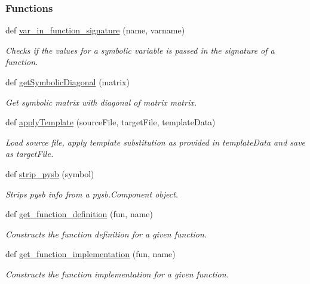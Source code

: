 \subsubsection*{Functions}
\begin{DoxyCompactItemize}
\item 
def \mbox{\hyperlink{namespaceamici_1_1ode__export_a365aaf8b78bb2db9c94b1a8087d60a16}{var\+\_\+in\+\_\+function\+\_\+signature}} (name, varname)
\begin{DoxyCompactList}\small\item\em Checks if the values for a symbolic variable is passed in the signature of a function. \end{DoxyCompactList}\item 
def \mbox{\hyperlink{namespaceamici_1_1ode__export_aed240175cce2aa528fe24d1486c52559}{get\+Symbolic\+Diagonal}} (matrix)
\begin{DoxyCompactList}\small\item\em Get symbolic matrix with diagonal of matrix {\ttfamily matrix}. \end{DoxyCompactList}\item 
def \mbox{\hyperlink{namespaceamici_1_1ode__export_af4b013340d08cdef3247601d2bf0b62f}{apply\+Template}} (source\+File, target\+File, template\+Data)
\begin{DoxyCompactList}\small\item\em Load source file, apply template substitution as provided in template\+Data and save as target\+File. \end{DoxyCompactList}\item 
def \mbox{\hyperlink{namespaceamici_1_1ode__export_ad632f77725600e4f03e996f4dd88f361}{strip\+\_\+pysb}} (symbol)
\begin{DoxyCompactList}\small\item\em Strips pysb info from a pysb.\+Component object. \end{DoxyCompactList}\item 
def \mbox{\hyperlink{namespaceamici_1_1ode__export_a128fdb36a0dd6b83a170543ff04659e0}{get\+\_\+function\+\_\+definition}} (fun, name)
\begin{DoxyCompactList}\small\item\em Constructs the function definition for a given function. \end{DoxyCompactList}\item 
def \mbox{\hyperlink{namespaceamici_1_1ode__export_a186e3d3705236051c7d43bbd0a91ea08}{get\+\_\+function\+\_\+implementation}} (fun, name)
\begin{DoxyCompactList}\small\item\em Constructs the function implementation for a given function. \end{DoxyCompactList}\item 

\end{DoxyCompactItemize}
